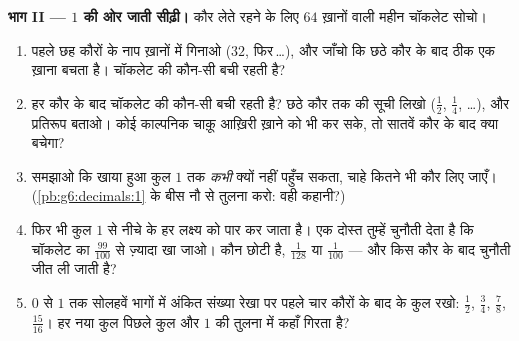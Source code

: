 \begin{problem}
\medskip
\noindent\textbf{भाग II --- $1$ की ओर जाती सीढ़ी।}
कौर लेते रहने के लिए $64$ ख़ानों वाली महीन चॉकलेट सोचो।
\begin{enumerate}[resume]
  \item पहले छह कौरों के नाप ख़ानों में गिनाओ ($32$,
        फिर\,\dots), और जाँचो कि छठे कौर के बाद ठीक एक ख़ाना
        बचता है। चॉकलेट की कौन-सी  बची रहती है?
  \item हर कौर के बाद चॉकलेट की कौन-सी  बची रहती है? छठे
        कौर तक की सूची लिखो ($\frac12$, $\frac14$, \dots), और
        प्रतिरूप बताओ। कोई काल्पनिक चाक़ू आख़िरी ख़ाने को भी 
        कर सके, तो सातवें कौर के बाद क्या बचेगा?
  \item समझाओ कि खाया हुआ कुल $1$ तक \emph{कभी} क्यों नहीं
        पहुँच सकता, चाहे कितने भी कौर लिए जाएँ।
        (\cref{pb:g6:decimals:1} के बीस नौ से तुलना करो: वही
        कहानी?)
  \item फिर भी कुल $1$ से नीचे के हर लक्ष्य को पार कर जाता है।
        एक दोस्त तुम्हें चुनौती देता है कि चॉकलेट का
        $\frac{99}{100}$ से ज़्यादा खा जाओ। कौन छोटी है,
        $\frac{1}{128}$ या $\frac{1}{100}$ --- और किस कौर के बाद
        चुनौती जीत ली जाती है?
  \item $0$ से $1$ तक सोलहवें भागों में अंकित संख्या रेखा पर
        पहले चार कौरों के बाद के कुल रखो: $\frac12$, $\frac34$,
        $\frac78$, $\frac{15}{16}$। हर नया कुल पिछले कुल और $1$
        की तुलना में कहाँ गिरता है?
\end{enumerate}


\end{problem}
